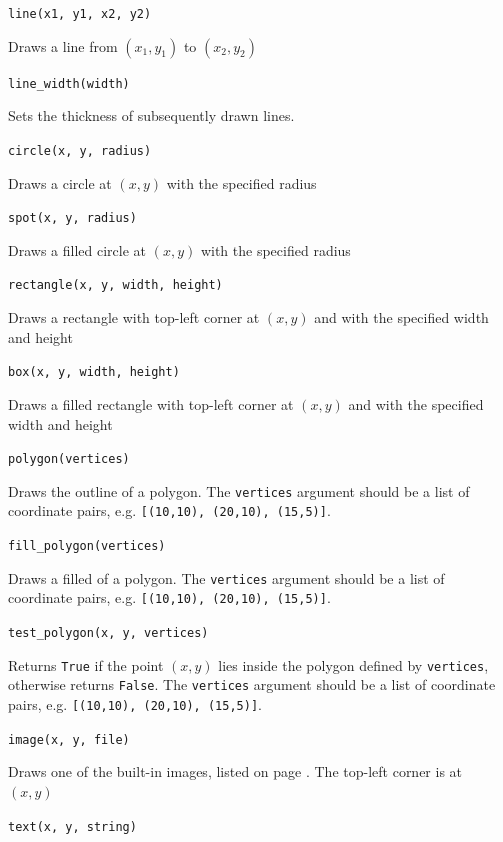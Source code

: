 \documentclass[12pt,a4paper,twoside]{article}
\renewcommand{\_}{\texttt{\symbol{95}}}
\begin{document}
\begin{bulletlist}
\item \verb^line(x1, y1, x2, y2)^

	Draws a line from $(x_1,y_1)$ to $(x_2,y_2)$

\item \verb^line_width(width)^

	Sets the thickness of subsequently drawn lines.

\item \verb^circle(x, y, radius)^

	Draws a circle at $(x,y)$ with the specified radius

\item \verb^spot(x, y, radius)^

	Draws a filled circle at $(x,y)$ with the specified radius

\item \verb^rectangle(x, y, width, height)^

	Draws a rectangle with top-left corner at $(x,y)$ and with the specified width and height

\item \verb^box(x, y, width, height)^

	Draws a filled rectangle with top-left corner at $(x,y)$ and with the specified width and height

\item \verb^polygon(vertices)^

	Draws the outline of a polygon. The \verb^vertices^ argument should be a list of coordinate pairs, e.g. \verb^[(10,10), (20,10), (15,5)]^.

\item \verb^fill_polygon(vertices)^

	Draws a filled of a polygon. The \verb^vertices^ argument should be a list of coordinate pairs, e.g. \verb^[(10,10), (20,10), (15,5)]^.

\item \verb^test_polygon(x, y, vertices)^

	Returns \verb^True^ if the point $(x,y)$ lies inside the polygon defined by \verb^vertices^, otherwise returns \verb^False^. The \verb^vertices^ argument should be a list of coordinate pairs, e.g. \verb^[(10,10), (20,10), (15,5)]^.

\item \verb^image(x, y, file)^

	Draws one of the built-in images, listed on page \pageref{images}. The top-left corner is at $(x,y)$
\item \verb^text(x, y, string)^


\end{bulletlist}
\end{document}
